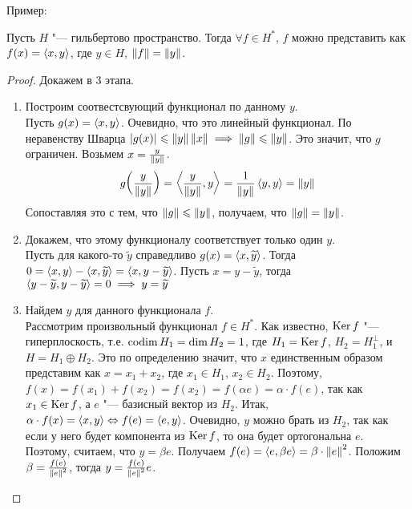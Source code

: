 Пример: \todo

\begin{theorem}
	Пусть $H$ "--- гильбертово пространство.
    Тогда $\forall f \in H^*$, $f$ можно представить как $f(x) = \left\langle x , y\right\rangle$, где $y \in H$, $\left\|f\right\| = \left\|y\right\|$.
\end{theorem}
\begin{proof}
	Докажем в 3 этапа.
	\begin{enumerate}
		\item Построим соотвестсвующий функционал по данному $y$. \\
            Пусть $g(x) = \left\langle x , y\right\rangle$. Очевидно, что это линейный функционал.
            По неравенству Шварца $\left|g(x)\right| \leqslant \left\|y\right\| \left\|x\right\| \implies \left\|g\right\| \leqslant \left\|y\right\|$.
            Это значит, что $g$ ограничен.
            Возьмем $x = \frac{y}{\left\|y\right\|}$.
            \[
                g\mathopen{}\left(\frac{y}{\left\|y\right\|}\mathclose{}\right) = \left\langle \frac{y}{\left\|y\right\|} , y\right\rangle
                    = \frac{1}{\left\|y\right\|}\left\langle y , y\right\rangle = \left\|y\right\|
            \]
            Сопоставляя это с тем, что $\left\|g\right\| \leqslant \left\|y\right\|$, получаем, что $\left\|g\right\| = \left\|y\right\|$.
		\item Докажем, что этому функционалу соответствует только один $y$. \\
            Пусть для какого-то $\widetilde{y}$ справедливо $g(x) = \left\langle x , \widetilde{y}\right\rangle$.
            Тогда $0 = \left\langle x , y\right\rangle - \left\langle x , \widetilde{y}\right\rangle = \left\langle x , y - \widetilde{y}\right\rangle$.
            Пусть $x = y - \widetilde{y}$, тогда
            $\left\langle y - \widetilde{y} , y - \widetilde{y}\right\rangle = 0 \implies y = \widetilde{y}$
		\item Найдем $y$ для данного функционала $f$. \\
            Рассмотрим произвольный функционал $f \in H^*$.
            Как известно, $\operatorname{Ker} f$ "--- гиперплоскость, т.е.
            $\operatorname{codim} H_1 = \dim H_2 = 1$, где $H_1 = \operatorname{Ker} f$, $H_2 = H_1^\bot$, и $H = H_1 \oplus H_2$.
            Это по определению значит, что $x$ единственным образом представим как $x = x_1 + x_2$, где $x_1 \in H_1$, $x_2 \in H_2$.
            Поэтому, $f(x) = f(x_1) + f(x_2) = f(x_2) = f(\alpha e) = \alpha \cdot f(e)$,
            так как $x_1 \in \operatorname{Ker} f$, а $e$ "--- базисный вектор из $H_2$.
            Итак, $\alpha \cdot f(x) = \left\langle x , y\right\rangle \Leftrightarrow f(e) = \left\langle e , y\right\rangle$.
            Очевидно, $y$ можно брать из $H_2$, так как если у него будет компонента из $\operatorname{Ker} f$, то она будет ортогональна $e$.
            Поэтому, считаем, что $y = \beta e$.
            Получаем $f(e) = \left\langle e , \beta e\right\rangle = \beta \cdot \left\|e\right\|^2$.
            Положим $\beta = \frac{f(e)}{\left\|e\right\|^2}$, тогда $y = \frac{f(e)}{\left\|e\right\|^2}e$.
	\end{enumerate}
\end{proof}


